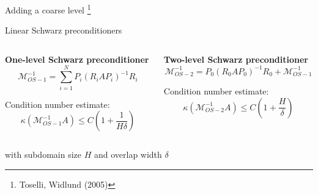 \begin{frame}[noframenumbering]{Adding a coarse level \footnote{\tiny Toselli, Widlund (2005)}}

	{\Large Linear Schwarz preconditioners}
	\vspace*{4mm}
	\begin{columns}
		\begin{column}{0.5\textwidth}
			{\bf One-level Schwarz preconditioner}
			\begin{equation*}
				\mathcal{M}^{-1}_{OS-1}=\sum_{i=1}^{N}P_i(R_iAP_i)^{-1}R_i
			\end{equation*}
			\begin{block}{\normalsize Condition number estimate:}
				\begin{equation*}
					\kappa(\mathcal{M}^{-1}_{OS-1}A)\leq C(1+\frac{1}{H\delta})
				\end{equation*}
			\end{block}
		\end{column}
		\begin{column}{0.5\textwidth}
			{\bf Two-level Schwarz preconditioner}
			\vspace*{3mm}
			\begin{equation*}
				\mathcal{M}^{-1}_{OS-2}=P_0(R_0AP_0)^{-1}R_0 + \mathcal{M}^{-1}_{OS-1}
			\end{equation*}
			\begin{block}{\normalsize Condition number estimate:}
				\begin{equation*}
					\kappa(\mathcal{M}^{-1}_{OS-2}A)\leq C(1+\frac{H}{\delta})
				\end{equation*}
			\end{block}
		\end{column}
	\end{columns}
	\vspace*{4mm}
	\centering
	with subdomain size $H$ and overlap width $\delta$
\end{frame}

